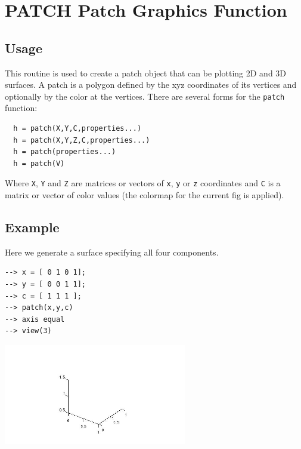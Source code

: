\section{PATCH Patch Graphics Function
}

\subsection{Usage}

This routine is used to create a patch object that can be plotting 2D and 3D surfaces.  A 
patch is a polygon defined by the xyz coordinates
of its vertices and optionally by the color at the vertices.
There are several forms for the \verb|patch| function:
\begin{verbatim}
  h = patch(X,Y,C,properties...)
  h = patch(X,Y,Z,C,properties...)
  h = patch(properties...)
  h = patch(V)
\end{verbatim}
Where \verb|X|, \verb|Y| and \verb|Z| are matrices or vectors of \verb|x|, \verb|y| or \verb|z| coordinates
and \verb|C| is a matrix or vector of color values (the colormap
for the current fig is applied).  
\subsection{Example}

Here we generate a surface specifying all four components.
\begin{verbatim}
--> x = [ 0 1 0 1];
--> y = [ 0 0 1 1];
--> c = [ 1 1 1 ];
--> patch(x,y,c)
--> axis equal
--> view(3)
\end{verbatim}


\centerline{\includegraphics[width=8cm]{patch1}}


